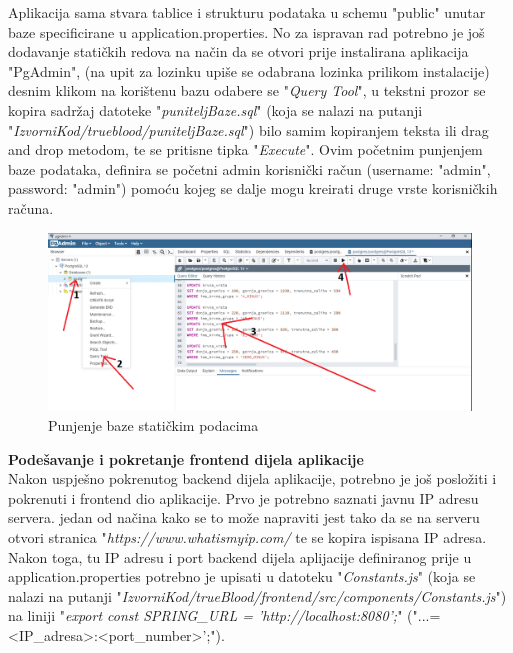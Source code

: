 			Aplikacija sama stvara tablice i strukturu podataka u schemu "public" unutar baze specificirane u application.properties. No za ispravan rad potrebno je još dodavanje statičkih redova na način da se otvori prije instalirana aplikacija "PgAdmin", (na upit za lozinku upiše se odabrana lozinka prilikom instalacije) desnim klikom na korištenu bazu odabere se "\textit{Query Tool}", u tekstni prozor se kopira sadržaj datoteke "\textit{puniteljBaze.sql}" (koja se nalazi na putanji "\textit{IzvorniKod/trueblood/puniteljBaze.sql}") bilo samim kopiranjem teksta ili drag and drop metodom, te se pritisne tipka "\textit{Execute}". Ovim početnim punjenjem baze podataka, definira se početni admin korisnički račun (username: "admin", password: "admin") pomoću kojeg se dalje mogu kreirati druge vrste korisničkih računa.
			
			\begin{figure}[H]
			\centering
			\includegraphics[width=\textwidth, scale=0.5]{slike/puniteljBaze}
			\caption{Punjenje baze statičkim podacima}
			\label{fig:puniteljBaze}
			\end{figure}
			
			\textbf{Podešavanje i pokretanje frontend dijela aplikacije}\\
			Nakon uspješno pokrenutog backend dijela aplikacije, potrebno je još posložiti i pokrenuti i frontend dio aplikacije. Prvo je potrebno saznati javnu IP adresu servera. jedan od načina kako se to može napraviti jest tako da se na serveru otvori stranica "\textit{https://www.whatismyip.com/} te se kopira ispisana IP adresa. Nakon toga, tu IP adresu i port backend dijela aplijacije definiranog prije u application.properties potrebno je upisati u datoteku "\textit{Constants.js}" (koja se nalazi na putanji "\textit{IzvorniKod/trueBlood/frontend/src/components/Constants.js}") na liniji "\textit{export const SPRING_URL = 'http://localhost:8080';}" ("...= <IP_adresa>:<port_number>';").

